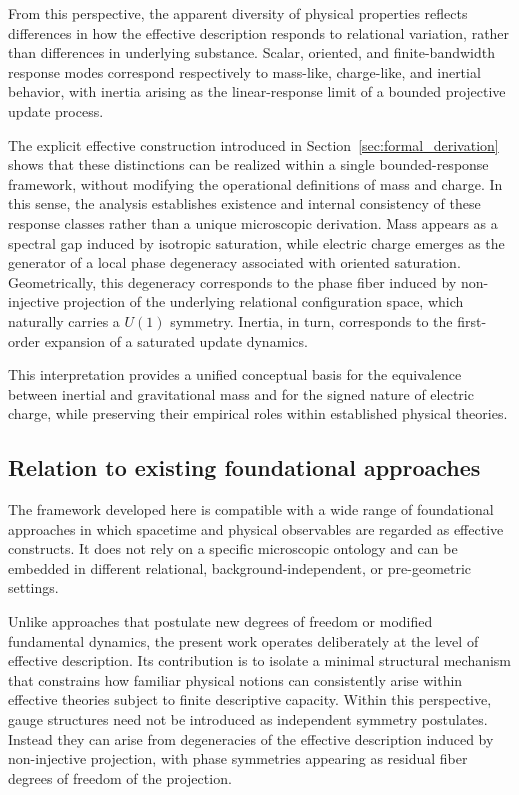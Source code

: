 \documentclass[pdflatex,sn-mathphys-num]{sn-jnl} %
\theoremstyle{remark}
\begin{document}
    From this perspective, the apparent diversity of physical properties reflects
    differences in how the effective description responds to relational variation,
    rather than differences in underlying substance.
    Scalar, oriented, and finite-bandwidth response modes correspond respectively to
    mass-like, charge-like, and inertial behavior, with inertia arising as the
    linear-response limit of a bounded projective update process.

    The explicit effective construction introduced in
    Section~\ref{sec:formal_derivation} shows that these distinctions can be realized
    within a single bounded-response framework, without modifying the operational
    definitions of mass and charge.
    In this sense, the analysis establishes existence and internal consistency of
    these response classes rather than a unique microscopic derivation.
    Mass appears as a spectral gap induced by isotropic saturation, while electric charge emerges as the generator of a
    local phase degeneracy associated with
    oriented saturation.
    Geometrically, this degeneracy corresponds to the phase fiber induced by
    non-injective projection of the underlying relational configuration space,
    which naturally carries a $U(1)$ symmetry.
    Inertia, in turn, corresponds to the first-order expansion of a saturated update
    dynamics.

    This interpretation provides a unified conceptual basis for the equivalence
    between inertial and gravitational mass and for the signed nature of electric
    charge, while preserving their empirical roles within established physical
    theories.

  \subsection{Relation to existing foundational approaches}
    \label{subsec:relation}

    The framework developed here is compatible with a wide range of foundational
    approaches in which spacetime and physical observables are regarded as effective
    constructs.
    It does not rely on a specific microscopic ontology and can be embedded in
    different relational, background-independent, or pre-geometric settings.

    Unlike approaches that postulate new degrees of freedom or modified fundamental
    dynamics, the present work operates deliberately at the level of effective
    description.
    Its contribution is to isolate a minimal structural mechanism that constrains
    how familiar physical notions can consistently arise within effective theories
    subject to finite descriptive capacity.
    Within this perspective, gauge structures need not be introduced as independent
    symmetry postulates.
    Instead they can arise from degeneracies of the effective description induced by
    non-injective projection, with phase symmetries appearing as residual fiber
    degrees of freedom of the projection.
\end{document}
